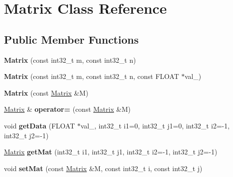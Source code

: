 \hypertarget{class_matrix}{\section{Matrix Class Reference}
\label{class_matrix}
}
\subsection*{Public Member Functions}
\begin{DoxyCompactItemize}
\item 
\hypertarget{class_matrix_a1fcc480b14621a8eeb6795464aa80cf7}{{\bfseries Matrix} (const int32\+\_\+t m, const int32\+\_\+t n)}\label{class_matrix_a1fcc480b14621a8eeb6795464aa80cf7}

\item 
\hypertarget{class_matrix_acaadd30ecb0bf01687f2830f2965dca3}{{\bfseries Matrix} (const int32\+\_\+t m, const int32\+\_\+t n, const F\+L\+O\+A\+T $\ast$val\+\_\+)}\label{class_matrix_acaadd30ecb0bf01687f2830f2965dca3}

\item 
\hypertarget{class_matrix_a003d09f03ecb7db944793f55b0ee2020}{{\bfseries Matrix} (const \hyperlink{class_matrix}{Matrix} \&M)}\label{class_matrix_a003d09f03ecb7db944793f55b0ee2020}

\item 
\hypertarget{class_matrix_a24eca1353789b8df9aa3069386ca3a3c}{\hyperlink{class_matrix}{Matrix} \& {\bfseries operator=} (const \hyperlink{class_matrix}{Matrix} \&M)}\label{class_matrix_a24eca1353789b8df9aa3069386ca3a3c}

\item 
\hypertarget{class_matrix_a1808983bc662c67424fd51aad6bdec93}{void {\bfseries get\+Data} (F\+L\+O\+A\+T $\ast$val\+\_\+, int32\+\_\+t i1=0, int32\+\_\+t j1=0, int32\+\_\+t i2=-\/1, int32\+\_\+t j2=-\/1)}\label{class_matrix_a1808983bc662c67424fd51aad6bdec93}

\item 
\hypertarget{class_matrix_a6395b704f979655172bc6837edb82fea}{\hyperlink{class_matrix}{Matrix} {\bfseries get\+Mat} (int32\+\_\+t i1, int32\+\_\+t j1, int32\+\_\+t i2=-\/1, int32\+\_\+t j2=-\/1)}\label{class_matrix_a6395b704f979655172bc6837edb82fea}

\item 
\hypertarget{class_matrix_ac67d89e0e46e17c47c0040df06d9a857}{void {\bfseries set\+Mat} (const \hyperlink{class_matrix}{Matrix} \&M, const int32\+\_\+t i, const int32\+\_\+t j)}\label{class_matrix_ac67d89e0e46e17c47c0040df06d9a857}


\end{DoxyCompactItemize}
